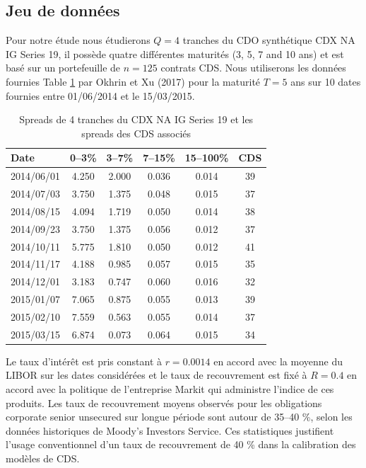 \subsection{Jeu de données}\label{subsec:data}

Pour notre étude nous étudierons $Q = 4$ tranches du CDO synthétique
CDX NA IG Series 19, il possède quatre différentes maturités (3, 5, 7
and 10 ans) et est basé sur un portefeuille de $n = 125$ contrats CDS.
Nous utiliserons les données fournies Table \ref{tab:OkhrinXu} par Okhrin et Xu (2017) pour la
maturité $T = 5$ ans sur 10 dates fournies entre 01/06/2014 et le 
15/03/2015.

\begin{table}[H]
\centering
\begin{tabular}{lccccc}
\toprule
Date & 0--3\% & 3--7\% & 7--15\% & 15--100\% & CDS \\
\midrule
2014/06/01 & 4.250 & 2.000 & 0.036 & 0.014 & 39 \\
2014/07/03 & 3.750 & 1.375 & 0.048 & 0.015 & 37 \\
2014/08/15 & 4.094 & 1.719 & 0.050 & 0.014 & 38 \\
2014/09/23 & 3.750 & 1.375 & 0.056 & 0.012 & 37 \\
2014/10/11 & 5.775 & 1.810 & 0.050 & 0.012 & 41 \\
2014/11/17 & 4.188 & 0.985 & 0.057 & 0.015 & 35 \\
2014/12/01 & 3.183 & 0.747 & 0.060 & 0.016 & 32 \\
2015/01/07 & 7.065 & 0.875 & 0.055 & 0.013 & 39 \\
2015/02/10 & 7.559 & 0.563 & 0.055 & 0.014 & 37 \\
2015/03/15 & 6.874 & 0.073 & 0.064 & 0.015 & 34 \\
\bottomrule
\end{tabular}
\caption{Spreads de 4 tranches du CDX NA IG Series 19 et les spreads des CDS associés}
\label{tab:OkhrinXu}
\end{table}

Le taux d'intérêt est pris constant à $r = 0.0014$ en accord avec la moyenne du LIBOR sur les
dates considérées et le taux de recouvrement est fixé à $R = 0.4$ en accord avec
la politique de l'entreprise Markit qui administre l'indice de ces produits. \cite{OhkrinXu}
Les taux de recouvrement moyens observés pour les obligations corporate senior unsecured sur 
longue période sont autour de 35--40 \%, selon les données historiques de Moody's Investors Service. Ces statistiques justifient l'usage conventionnel
d'un taux de recouvrement de 40 \% dans la calibration des modèles de CDS. \cite{Tresor}



